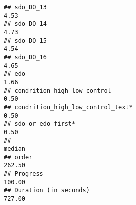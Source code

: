 \documentclass[
]{article}
\begin{document}
\begin{verbatim}
## sdo_DO_13                                                                                                                                                                                                                     4.53
## sdo_DO_14                                                                                                                                                                                                                     4.73
## sdo_DO_15                                                                                                                                                                                                                     4.54
## sdo_DO_16                                                                                                                                                                                                                     4.65
## edo                                                                                                                                                                                                                           1.66
## condrition_high_low_control                                                                                                                                                                                                   0.50
## condrition_high_low_control_text*                                                                                                                                                                                             0.50
## sdo_or_edo_first*                                                                                                                                                                                                             0.50
##                                                                                                                                                                                                                            median
## order                                                                                                                                                                                                                      262.50
## Progress                                                                                                                                                                                                                   100.00
## Duration (in seconds)                                                                                                                                                                                                      727.00

\end{verbatim}
\end{document}
